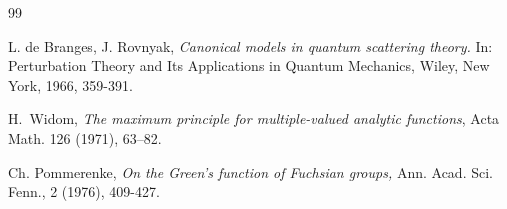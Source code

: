 \documentclass[reqno,11pt,centertags]{article}
\theoremstyle{definition}
\begin{document}
\begin{thebibliography}{99}

 L. de Branges, J. Rovnyak, \emph{Canonical models in quantum scattering theory.}
In: Perturbation Theory and Its Applications in Quantum Mechanics, Wiley, New York, 1966, 359-391.







 H.~Widom,
{\it The maximum principle for multiple-valued analytic functions},
Acta Math. {126} (1971), 63--82.


 Ch. Pommerenke, \textit{On the Green's function of Fuchsian groups,}
Ann. Acad. Sci. Fenn., 2 (1976), 409-427.



\end{thebibliography}
\end{document}
